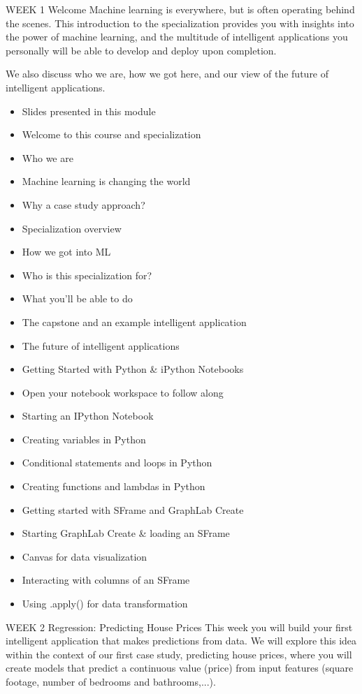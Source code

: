 WEEK 1
Welcome
Machine learning is everywhere, but is often operating behind the scenes.
This introduction to the specialization provides you with insights into the power of machine learning, and the multitude of intelligent applications you personally will be able to develop and deploy upon completion.

We also discuss who we are, how we got here, and our view of the future of intelligent applications.
\begin{itemize}
\item Slides presented in this module
\item Welcome to this course and specialization
\item Who we are
\item Machine learning is changing the world
\item Why a case study approach?
\item Specialization overview
\item How we got into ML
\item Who is this specialization for?
\item What you'll be able to do
\item The capstone and an example intelligent application
\item The future of intelligent applications
\item Getting Started with Python & iPython Notebooks
\item Open your notebook workspace to follow along
\item Starting an IPython Notebook
\item Creating variables in Python
\item Conditional statements and loops in Python
\item Creating functions and lambdas in Python
\item Getting started with SFrame and GraphLab Create
\item Starting GraphLab Create & loading an SFrame
\item Canvas for data visualization
\item Interacting with columns of an SFrame
\item Using .apply() for data transformation
\end{itemize}
\newpage

WEEK 2
Regression: Predicting House Prices
This week you will build your first intelligent application that makes predictions from data.
We will explore this idea within the context of our first case study, predicting house prices, where you will create models that predict a continuous value (price) from input features (square footage, number of bedrooms and bathrooms,...).

